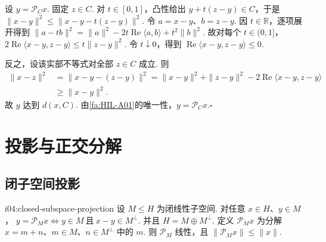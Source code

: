 \begin{FAProof}
设 \(\displaystyle y=\mathcal P_Cx\). 固定 \(\displaystyle z\in C\). 对 \(\displaystyle t\in[0,1]\)，凸性给出 \(\displaystyle y+t(z-y)\in C\)，于是 \(\displaystyle \|x-y\|^2 \leqslant\|x-y-t(z-y)\|^2\).
令 \(\displaystyle a=x-y\)、\(\displaystyle b=z-y\). 因 \(\displaystyle t\in\mathbb R\)，逐项展开得到 \(\displaystyle \|a-tb\|^2 =\|a\|^2-2t\operatorname{Re}\langle a,b\rangle+t^2\|b\|^2\).
故对每个 \(\displaystyle t\in(0,1]\)， \(\displaystyle 2\operatorname{Re}\langle x-y,z-y\rangle \leqslant t\|z-y\|^2\).
令 \(\displaystyle t\downarrow0\)，得到 \(\displaystyle \operatorname{Re}\langle x-y,z-y\rangle\leqslant0\).

反之，设该实部不等式对全部 \(\displaystyle z\in C\) 成立. 则
\begin{align*}
\|x-z\|^2
&=\|x-y-(z-y)\|^2=\|x-y\|^2+\|z-y\|^2-2\operatorname{Re}\langle x-y,z-y\rangle\\
&\geqslant\|x-y\|^2.
\end{align*}
故 \(\displaystyle y\) 达到 \(\displaystyle d(x,C)\). 由\autoref{fa:HIL-A01}的唯一性，\(\displaystyle y=\mathcal P_Cx\).\hfill\(\square\)

\end{FAProof}

\newpage
\section{投影与正交分解}\label{sec:i04-orthogonal-decomposition}

\subsection{闭子空间投影}

\begin{FAProposition}[B][闭子空间投影与正交分解]{i04:closed-subspace-projection}
设 \(\displaystyle M\leqslant H\) 为闭线性子空间. 对任意 \(\displaystyle x\in H\)、\(\displaystyle y\in M\)， \(\displaystyle y=\mathcal P_Mx \iff y\in M\ \text{且}\ x-y\in M^\perp\).
并且 \(\displaystyle H=M\oplus M^\perp\).
定义 \(\displaystyle \mathcal P_Mx\) 为分解 \(\displaystyle x=m+n\)、\(\displaystyle m\in M\)、\(\displaystyle n\in M^\perp\) 中的 \(\displaystyle m\). 则 \(\displaystyle \mathcal P_M\) 线性，且 \(\displaystyle \|\mathcal P_Mx\|\leqslant\|x\|\).
\end{FAProposition}

